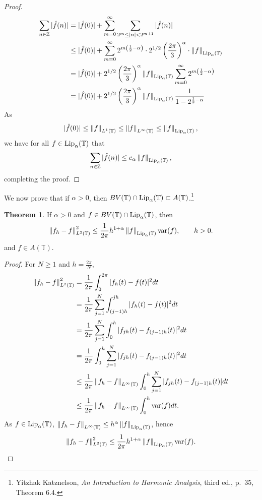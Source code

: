 \documentclass{article}
\newcommand{\var}{\ensuremath\mathrm{var}}
\newcommand{\Lip}{\ensuremath\mathrm{Lip}}
\newcommand{\norm}[1]{\left\Vert #1 \right\Vert}
\theoremstyle{definition}
\newtheorem{theorem}{Theorem}
\theoremstyle{definition}
\begin{document}
\begin{proof}
\begin{align*}
\sum_{n \in \mathbb{Z}} |\hat{f}(n)|&=|\hat{f}(0)|+\sum_{m=0}^\infty \sum_{2^m \leq |n| < 2^{m+1}} |\hat{f}(n)|\\
&\leq |\hat{f}(0)|+ \sum_{m=0}^\infty 2^{m\left(\frac{1}{2}-\alpha\right)} \cdot 2^{1/2} \left( \frac{2\pi}{3} \right)^\alpha \cdot  \norm{f}_{\Lip_\alpha(\mathbb{T})}\\
&= |\hat{f}(0)|+2^{1/2} \left( \frac{2\pi}{3} \right)^\alpha   \norm{f}_{\Lip_\alpha(\mathbb{T})} \sum_{m=0}^\infty 2^{m\left(\frac{1}{2}-\alpha\right)}\\
&= |\hat{f}(0)|+2^{1/2} \left( \frac{2\pi}{3} \right)^\alpha   \norm{f}_{\Lip_\alpha(\mathbb{T})} \frac{1}{1-2^{\frac{1}{2}-\alpha}}
\end{align*}
As
\[
|\hat{f}(0)| \leq \norm{f}_{L^1(\mathbb{T})} \leq \norm{f}_{L^\infty(\mathbb{T})} \leq \norm{f}_{\Lip_\alpha(\mathbb{T})},
\]
we have for all $f \in \Lip_\alpha(\mathbb{T})$ that
\[
\sum_{n \in \mathbb{Z}} |\hat{f}(n)| \leq c_\alpha \norm{f}_{\Lip_\alpha(\mathbb{T})},
\]
completing the proof.
\end{proof}

We now prove that if $\alpha>0$, then  $BV(\mathbb{T}) \cap \Lip_\alpha(\mathbb{T}) \subset A(\mathbb{T})$.\footnote{Yitzhak Katznelson, {\em An Introduction to Harmonic Analysis}, third ed., p.~35, Theorem 6.4.}

\begin{theorem}
If $\alpha>0$ and $f \in BV(\mathbb{T}) \cap \Lip_\alpha(\mathbb{T})$, then
\[
\norm{f_h-f}_{L^2(\mathbb{T})}^2 \leq \frac{1}{2\pi} h^{1+\alpha} \norm{f}_{\Lip_\alpha(\mathbb{T})} \var(f), \qquad h > 0.
\]
and $f \in A(\mathbb{T})$.
\end{theorem}
\begin{proof}
For $N \geq 1$ and $h=\frac{2\pi}{N}$,
\begin{align*}
\norm{f_h-f}_{L^2(\mathbb{T})}^2&=\frac{1}{2\pi} \int_0^{2\pi} |f_h(t)-f(t)|^2 dt\\
&=\frac{1}{2\pi} \sum_{j=1}^N \int_{(j-1)h}^{jh} |f_h(t)-f(t)|^2 dt\\
&=\frac{1}{2\pi} \sum_{j=1}^N \int_0^h |f_{jh}(t)-f_{(j-1)h}(t)|^2 dt\\
&=\frac{1}{2\pi} \int_0^h \sum_{j=1}^N |f_{jh}(t)-f_{(j-1)h}(t)|^2 dt\\
&\leq \frac{1}{2\pi} \norm{f_h-f}_{L^\infty(\mathbb{T})} \int_0^h \sum_{j=1}^N |f_{jh}(t)-f_{(j-1)h}(t)| dt\\
&\leq \frac{1}{2\pi}  \norm{f_h-f}_{L^\infty(\mathbb{T})} \int_0^h  \var(f) dt.
\end{align*}
As $f \in \Lip_\alpha(\mathbb{T})$, $\norm{f_h-f}_{L^\infty(\mathbb{T})} \leq h^\alpha \norm{f}_{\Lip_\alpha(\mathbb{T})}$, hence
\[
\norm{f_h-f}_{L^2(\mathbb{T})}^2 \leq \frac{1}{2\pi} h^{1+\alpha} \norm{f}_{\Lip_\alpha(\mathbb{T})} \var(f).
\]
\end{proof}
\end{document}
